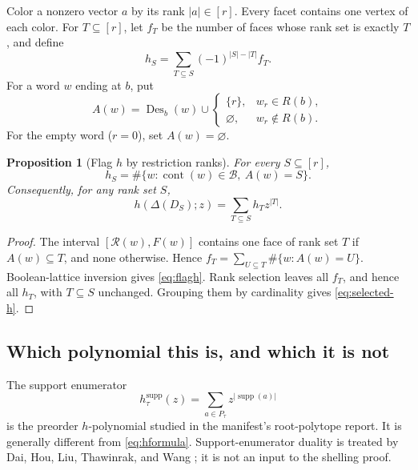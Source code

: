 \documentclass[11pt]{article}
\numberwithin{equation}{section}
\newtheorem{proposition}[theorem]{Proposition}
\theoremstyle{definition}
\theoremstyle{remark}
\newcommand{\B}{\mathcal B}
\newcommand{\supp}{\operatorname{supp}}
\newcommand{\cont}{\operatorname{cont}}
\begin{document}
Color a nonzero vector $a$ by its rank $|a|\in[r]$. Every facet contains one
vertex of each color. For $T\subseteq[r]$, let $f_T$ be the number of faces
whose rank set is exactly $T$, and define
\[
 h_S=\sum_{T\subseteq S}(-1)^{|S|-|T|}f_T.
\]
For a word $w$ ending at $b$, put
\begin{equation}
 A(w)=\operatorname{Des}_b(w)\cup
       \begin{cases}\{r\},&w_r\in R(b),\\
                     \varnothing,&w_r\notin R(b).
       \end{cases}
 \label{eq:restriction-ranks}
\end{equation}
For the empty word ($r=0$), set $A(w)=\varnothing$.

\begin{proposition}[Flag $h$ by restriction ranks]
\label{prop:flagh}
For every $S\subseteq[r]$,
\begin{equation}
 h_S=\#\{w:\cont(w)\in\B,\ A(w)=S\}.
 \label{eq:flagh}
\end{equation}
Consequently, for any rank set $S$,
\begin{equation}
 h(\Delta(D_S);z)=\sum_{T\subseteq S}h_Tz^{|T|}.
 \label{eq:selected-h}
\end{equation}
\end{proposition}

\begin{proof}
The interval $[\mathcal R(w),F(w)]$ contains one face of rank set $T$ if
$A(w)\subseteq T$, and none otherwise. Hence
$f_T=\sum_{U\subseteq T}\#\{w:A(w)=U\}$. Boolean-lattice inversion gives
\eqref{eq:flagh}. Rank selection leaves all $f_T$, and hence all $h_T$, with
$T\subseteq S$ unchanged. Grouping them by cardinality gives
\eqref{eq:selected-h}.
\end{proof}

\subsection{Which polynomial this is, and which it is not}

The support enumerator
\[
 h_\tau^{\mathrm{supp}}(z)=\sum_{a\in P_\tau}z^{|\supp(a)|}
\]
is the preorder $h$-polynomial studied in the manifest's root-polytope report.
It is generally different from \eqref{eq:hformula}. Support-enumerator
duality is treated by Dai, Hou, Liu, Thawinrak, and Wang \cite{DHLTW}; it is
not an input to the shelling proof.
\end{document}
